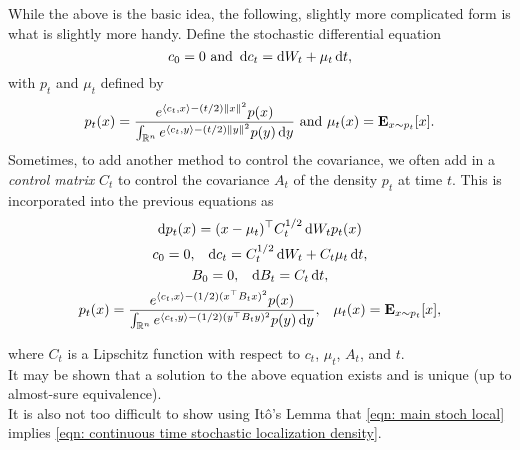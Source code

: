 		While the above is the basic idea, the following, slightly more complicated form is what is slightly more handy. Define the stochastic differential equation
		\begin{equation}
			\label{eqn: stochastic localization identity control}
			c_0 = 0 \text{ and } \operatorname{d}\!{c}_t = \operatorname{d}\!{W}_t + \mu_t\operatorname{d}\!{t},
		\end{equation}
		with $p_t$ and $\mu_t$ defined by
		\[ p_t(x) = \frac{e^{\langle c_t,x\rangle - (t/2)\left\lVert x\right\rVert^2}p(x)}{\int_{\mathbb{R}^n}e^{\langle c_t,y\rangle - (t/2)\left\lVert y\right\rVert^2}p(y)\operatorname{d}\!{y}}\text{ and } \mu_t(x) = \textbf{E}_{x\sim p_t} [x]. \]
		Sometimes, to add another method to control the covariance, we often add in a \textit{control matrix} $C_t$ to control the covariance $A_t$ of the density $p_t$ at time $t$. This is incorporated into the previous equations as
		\begin{equation}
			\label{eqn: main stoch local}
			\begin{gathered}
				\d{p_t}(x) =  (x - \mu_t)^\top C_t^{1/2} \d{W}_t p_t(x) \\
				c_0 = 0, \;\;\; \d{c}_t = C_t^{1/2}\d{W}_t + C_t\mu_t\d{t}, \\
				B_0 = 0, \;\;\; \d{B}_t = C_t\d{t}, \\
				p_t(x) = \frac{e^{\langle c_t,x\rangle - (1/2)(x^\top B_t x)^2}p(x)}{\int_{\Rn}e^{\langle c_t,y\rangle - (1/2)(y^\top B_t y)^2}p(y)\d{y}}, \;\;\; \mu_t(x) = \expec_{x\sim p_t} [x], \\	
			\end{gathered}
		\end{equation}

		where $C_t$ is a Lipschitz function with respect to $c_t$, $\mu_t$, $A_t$, and $t$.\\
		It may be shown that a solution to the above equation exists and is unique (up to almost-sure equivalence).\\
		It is also not too difficult to show using It\^{o}'s Lemma that \eqref{eqn: main stoch local} implies \eqref{eqn: continuous time stochastic localization density}.\\


